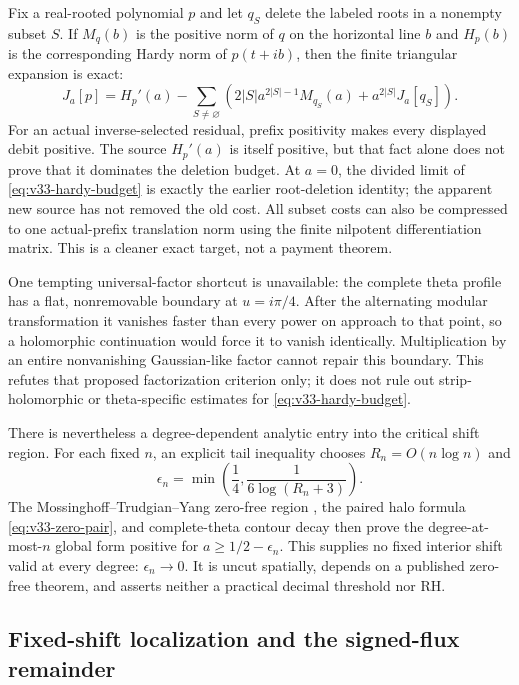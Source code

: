 \documentclass[11pt]{article}
\theoremstyle{definition}
\theoremstyle{remark}
\begin{document}
Fix a real-rooted polynomial $p$ and let $q_S$ delete the labeled roots in a
nonempty subset $S$. If $M_q(b)$ is the positive norm of $q$ on the horizontal
line $b$ and $H_p(b)$ is the corresponding Hardy norm of $p(t+ib)$, then the
finite triangular expansion is exact:
\begin{equation}
 J_a[p]=H_p'(a)-\sum_{S\ne\varnothing}
 \left(2|S|a^{2|S|-1}M_{q_S}(a)+a^{2|S|}J_a[q_S]\right).
 \label{eq:v33-hardy-budget}
\end{equation}
For an actual inverse-selected residual, prefix positivity makes every
displayed debit positive. The source $H_p'(a)$ is itself positive, but that
fact alone does not prove that it dominates the deletion budget. At $a=0$,
the divided limit of \eqref{eq:v33-hardy-budget} is exactly the earlier
root-deletion identity; the apparent new source has not removed the old cost.
All subset costs can also be compressed to one actual-prefix translation norm
using the finite nilpotent differentiation matrix. This is a cleaner exact
target, not a payment theorem.

One tempting universal-factor shortcut is unavailable: the complete theta
profile has a flat, nonremovable boundary at $u=i\pi/4$. After the alternating
modular transformation it vanishes faster than every power on approach to that
point, so a holomorphic continuation would force it to vanish identically.
Multiplication by an entire nonvanishing Gaussian-like factor cannot repair
this boundary. This refutes that proposed factorization criterion only; it
does not rule out strip-holomorphic or theta-specific estimates for
\eqref{eq:v33-hardy-budget}.

There is nevertheless a degree-dependent analytic entry into the critical
shift region. For each fixed $n$, an explicit tail inequality chooses
$R_n=O(n\log n)$ and
\begin{equation}
 \epsilon_n=\min\!\left(\frac14,
       \frac{1}{6\log(R_n+3)}\right).
 \label{eq:v33-critical-band}
\end{equation}
The Mossinghoff--Trudgian--Yang zero-free region
\cite{MossinghoffTrudgianYang2024}, the paired halo formula
\eqref{eq:v33-zero-pair}, and complete-theta contour decay then prove the
degree-at-most-$n$ global form positive for
$a\ge1/2-\epsilon_n$. This supplies no fixed interior shift valid at every
degree: $\epsilon_n\to0$. It is uncut spatially, depends on a published
zero-free theorem, and asserts neither a practical decimal threshold nor RH.

\subsection{Fixed-shift localization and the signed-flux remainder}
\end{document}
